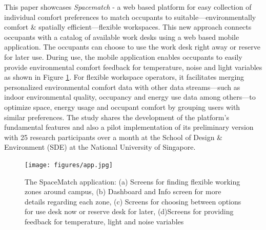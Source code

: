 \documentclass[]{interact}
\theoremstyle{plain}%
\theoremstyle{definition}
\theoremstyle{remark}
\begin{document}
This paper showcases \emph{Spacematch} - a web based platform for easy collection of individual comfort preferences to match occupants to suitable---environmentally comfort \& spatially efficient---flexible workspaces. This new approach connects occupants with a catalog of available work desks using a web based mobile application. The occupants can choose to use the work desk right away or reserve for later use. During use, the mobile application enables occupants to easily provide environmental comfort feedback for temperature, noise and light variables as shown in Figure \ref{app}. 
For flexible workspace operators, it facilitates merging personalized environmental comfort data with other data streams---such as indoor environmental quality, occupancy and energy use data among others---to optimize space, energy usage and occupant comfort by grouping users with similar preferences. The study shares the development of the platform's fundamental features and also a pilot implementation of its preliminary version with 25 research participants over a month at the School of Design \& Environment (SDE) at the National University of Singapore. 

\begin{figure}[H]
\centering
\texttt{[image: figures/app.jpg]}
\caption{The SpaceMatch application: (a) Screens for finding flexible working zones around campus, (b) Dashboard and Info screen for more details regarding each zone, (c) Screens for choosing between options for use desk now or reserve desk for later, (d)Screens for providing feedback for temperature, light and noise variables} 
\label{app}
\end{figure}
\end{document}
